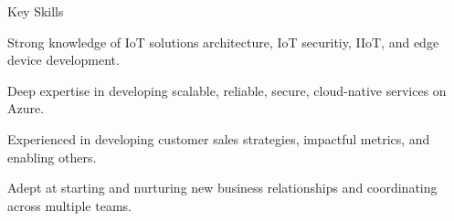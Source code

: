 \documentclass{resume} %
\begin{document}


\begin{rSection}{Key Skills}
\begin{rSubsectionNoTitle}
\item Strong knowledge of IoT solutions architecture, IoT securitiy, IIoT, and edge device development.
\item Deep expertise in developing scalable, reliable, secure, cloud-native services on Azure.
\item Experienced in developing customer sales strategies, impactful metrics, and enabling others.
\item Adept at starting and nurturing new business relationships and coordinating across multiple teams.
\end{rSubsectionNoTitle}
\end{rSection}
    
\end{document}
